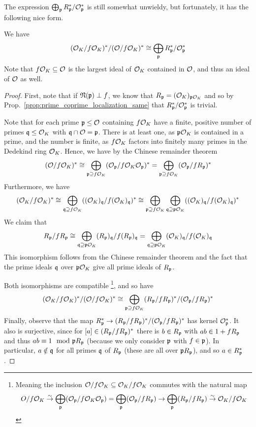 The expression $\bigoplus_\p R_\p^*/\O_\p^*$ is still somewhat unwieldy, but fortunately, it has the following nice form.
\begin{lemma}
    We have
    \begin{equation*}
        (\O_K/f\O_K)^*/(\O/f\O_K)^* \cong \bigoplus_\p R_\p^*/\O_\p^*
    \end{equation*}
    Note that $f\O_K \subseteq \O$ is the largest ideal of $\O_K$ contained in $\O$, and thus an ideal of $\O$ as well.
\end{lemma}
\begin{proof}
    First, note that if $\Norm(\p) \perp f$, we know that $R_\p = (\O_K)_{\p\O_K}$ and so by Prop.~\ref{prop:prime_coprime_localization_same} that $R_\p^*/\O_\p^*$ is trivial.
    
    Note that for each prime $\p \leq \O$ containing $f\O_K$ have a finite, positive number of primes $\q \leq \O_K$ with $\q \cap \O = \p$.
    There is at least one, as $\p\O_K$ is contained in a prime, and the number is finite, as $f\O_K$ factors into finitely many primes in the Dedekind ring $\O_K$.
    Hence, we have by the Chinese remainder theorem
    \begin{equation*}
        (\O/f\O_K)^* \cong \bigoplus_{\p \supseteq f\O_K} (\O_\p/f\O_K\O_\p)^* = \bigoplus_{\p \supseteq f\O_K} (\O_\p/fR_\p)^*
    \end{equation*}
    Furthermore, we have
    \begin{equation*}
        (\O_K/f\O_K)^* \cong \bigoplus_{\q \supseteq f\O_K} ((\O_K)_\q/f(\O_K)_\q)^* \cong \bigoplus_{\p \supseteq f\O_K} \bigoplus_{\q \supseteq \p\O_K} ((\O_K)_\q/f(\O_K)_\q)^*
    \end{equation*}
    We claim that
    \begin{equation*}
        R_\p/fR_\p \cong \bigoplus_{\q \supseteq \p\O_K} (R_\p)_\q/f(R_\p)_\q = \bigoplus_{\q \supseteq \p\O_K} (\O_K)_\q/f(\O_K)_\q
    \end{equation*}
    This isomorphism follows from the Chinese remainder theorem and the fact that the prime ideals $\q$ over $\p\O_K$ give all prime ideals of $R_\p$.
    
    Both isomorphisms are compatible
    \footnote{Meaning the inclusion $\O/f\O_K \subseteq \O_K/f\O_K$ commutes with the natural map
    \begin{equation*}
        O/f\O_K \overset{\sim}{\to} \bigoplus_\p (\O_\p/f\O_K\O_\p) = \bigoplus_\p (\O_\p/fR_\p) \to \bigoplus_\p (R_\p/fR_\p) \overset{\sim}{\to} \O_K/f\O_K
    \end{equation*}
    }, 
    and so have
    \begin{equation*}
        (\O_K/f\O_K)^*/(\O/f\O_K)^* \cong \bigoplus_{\p \supseteq f\O_K} (R_\p/fR_\p)^*/(\O_\p/fR_\p)^*
    \end{equation*}
    Finally, observe that the map $R_\p^* \to (R_\p/fR_\p)^*/(\O_\p/fR_\p)^*$ has kernel $\O_\p^*$.
    It also is surjective, since for $[a] \in (R_\p/fR_\p)^*$ there is $b \in R_\p$ with $ab \in 1 + fR_\p$ and thus $ab \equiv 1 \mod \p R_\p$ (because we only consider $\p$ with $f \in \p$).
    In particular, $a \notin \q$ for all primes $\q$ of $R_\p$ (these are all over $\p R_\p$), and so $a \in R_\p^*$.
\end{proof}
